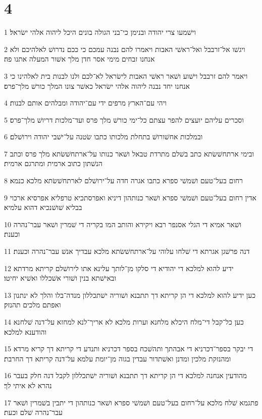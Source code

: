 \chapter{4}

\par 1 וישׁמעו צרי יהודה ובנימן כי־בני הגולה בונים היכל ליהוה אלהי ישׂראל׃
\par 2 ויגשׁו אל־זרבבל ואל־ראשׁי האבות ויאמרו להם נבנה עמכם כי ככם נדרושׁ לאלהיכם ולא אנחנו זבחים מימי אסר חדן מלך אשׁור המעלה אתנו פה׃
\par 3 ויאמר להם זרבבל וישׁוע ושׁאר ראשׁי האבות לישׂראל לא־לכם ולנו לבנות בית לאלהינו כי אנחנו יחד נבנה ליהוה אלהי ישׂראל כאשׁר צונו המלך כורשׁ מלך־פרס׃
\par 4 ויהי עם־הארץ מרפים ידי עם־יהודה ומבלהים אותם לבנות׃
\par 5 וסכרים עליהם יועצים להפר עצתם כל־ימי כורשׁ מלך פרס ועד־מלכות דריושׁ מלך־פרס׃
\par 6 ובמלכות אחשׁורושׁ בתחלת מלכותו כתבו שׂטנה על־ישׁבי יהודה וירושׁלם׃
\par 7 ובימי ארתחשׁשׂתא כתב בשׁלם מתרדת טבאל ושׁאר כנותו על־ארתחשׁשׂתא מלך פרס וכתב הנשׁתון כתוב ארמית ומתרגם ארמית׃
\par 8 רחום בעל־טעם ושׁמשׁי ספרא כתבו אגרה חדה על־ירושׁלם לארתחשׁשׂתא מלכא כנמא׃
\par 9 אדין רחום בעל־טעם ושׁמשׁי ספרא ושׁאר כנותהון דיניא ואפרסתכיא טרפליא אפרסיא ארכוי בבליא שׁושׁנכיא דהוא עלמיא׃
\par 10 ושׁאר אמיא די הגלי אסנפר רבא ויקירא והותב המו בקריה די שׁמרין ושׁאר עבר־נהרה וכענת׃
\par 11 דנה פרשׁגן אגרתא די שׁלחו עלוהי על־ארתחשׁשׂתא מלכא עבדיך אנשׁ עבר־נהרה וכענת׃
\par 12 ידיע להוא למלכא די יהודיא די סלקו מן־לותך עלינא אתו לירושׁלם קריתא מרדתא ובאישׁתא בנין ושׁורי אשׁכללו ואשׁיא יחיטו׃
\par 13 כען ידיע להוא למלכא די הן קריתא דך תתבנא ושׁוריה ישׁתכללון מנדה־בלו והלך לא ינתנון ואפתם מלכים תהנזק׃
\par 14 כען כל־קבל די־מלח היכלא מלחנא וערות מלכא לא אריך־לנא למחזא על־דנה שׁלחנא והודענא למלכא׃
\par 15 די יבקר בספר־דכרניא די אבהתך ותהשׁכח בספר דכרניא ותנדע די קריתא דך קריא מרדא ומהנזקת מלכין ומדנן ואשׁתדור עבדין בגוה מן־יומת עלמא על־דנה קריתא דך החרבת׃
\par 16 מהודעין אנחנה למלכא די הן קריתא דך תתבנא ושׁוריה ישׁתכללון לקבל דנה חלק בעבר נהרא לא איתי לך׃
\par 17 פתגמא שׁלח מלכא על־רחום בעל־טעם ושׁמשׁי ספרא ושׁאר כנותהון די יתבין בשׁמרין ושׁאר עבר־נהרה שׁלם וכעת׃
